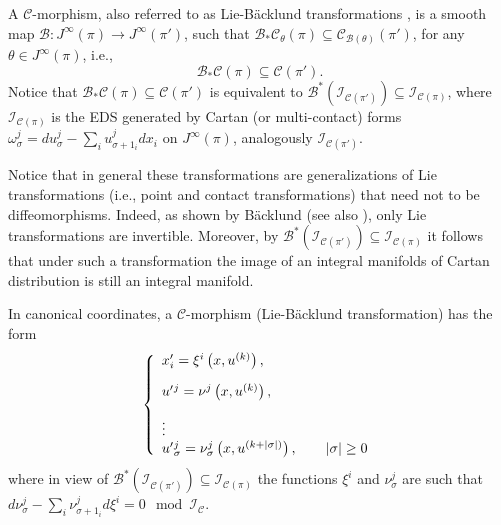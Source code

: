 \documentclass[12pt,english]{elsarticle}
\theoremstyle{plain}
\theoremstyle{plain}
\theoremstyle{remark}
\theoremstyle{plain}
\theoremstyle{definition}
\theoremstyle{definition}
\begin{document}
A $\mathcal{C}$-morphism, also referred to as Lie-B\"{a}cklund transformations
\cite{And-Ibr,KLV}, is a smooth map
$\mathcal{B}:J^{\infty}(\pi )\rightarrow J^{\infty}(\pi ')$, such that
$\mathcal{B}_{*}\mathcal{C}_{\theta}(\pi )\subseteq \mathcal{C}_{
\mathcal{B}(\theta )}(\pi ')$, for any $\theta \in J^{\infty}(\pi )$, i.e.,
%
\begin{equation}
\mathcal{B}_{*}\mathcal{C}(\pi )\subseteq \mathcal{C}(\pi ').
\label{C-invar}
\end{equation}
%
Notice that
$\mathcal{B}_{*}\mathcal{C}(\pi )\subseteq \mathcal{C}(\pi ')$ is equivalent
to
$\mathcal{B}^{*}\left (\mathcal{I}_{\mathcal{C}(\pi ')}\right )
\subseteq \mathcal{I}_{\mathcal{C}(\pi )}$, where
$\mathcal{I}_{\mathcal{C}(\pi )}$ is the EDS generated by Cartan (or multi-contact)
forms
$\omega _{\sigma}^{j}=du_{\sigma}^{j}-\sum _{i}u_{\sigma +1_{i}}^{j}dx_{i}$
on $J^{\infty}(\pi )$, analogously
$\mathcal{I}_{\mathcal{C}(\pi ')}$.%

Notice that in general these transformations are generalizations of Lie
transformations (i.e., point and contact transformations) that need not
to be diffeomorphisms. Indeed, as shown by B\"{a}cklund
\cite{Backlund2} (see also \cite{And-Ibr, Backlund1,Lie}), only Lie transformations are
invertible. Moreover, by
$\mathcal{B}^{*}\left (\mathcal{I}_{\mathcal{C}(\pi ')}\right )
\subseteq \mathcal{I}_{\mathcal{C}(\pi )}$ it follows that under such a
transformation the image of an integral manifolds of Cartan distribution
is still an integral manifold.


In canonical coordinates, a $\mathcal{C}$-morphism (Lie-B\"{a}cklund transformation)
has the form
%
\begin{equation}
\left \{
%
\begin{array}{l}
x'_{i}=\xi ^{i}\left (x,u^{(k)}\right ),
\vspace{10pt}
\\
u'{}^{j}=\nu ^{j}\left (x,u^{(k)}\right ),
\vspace{10pt}
\\
\vdots
\\
u'{}_{\sigma}^{j}=\nu _{\sigma}^{j}\left (x,u^{(k+|\sigma |)}\right ),
\qquad |\sigma |\geq 0
\end{array}
%
\right .
\label{eq:BL_transf}
\end{equation}
%
where in view of
$\mathcal{B}^{*}\left (\mathcal{I}_{\mathcal{C}(\pi ')}\right )
\subseteq \mathcal{I}_{\mathcal{C}(\pi )}$ the functions $\xi ^{i}$ and
$\nu _{\sigma}^{j}$ are such that
$d\nu _{\sigma}^{j}-\sum _{i}\nu _{\sigma +1_{i}}^{j}d\xi ^{i}=0
\mod{\mathcal{I}_{\mathcal{C}}}$.
\end{document}
